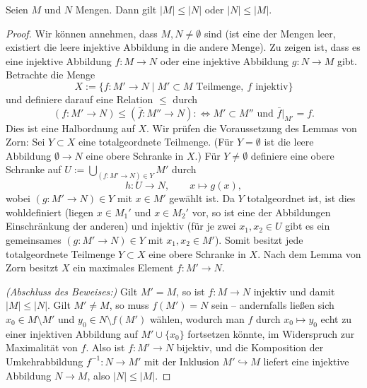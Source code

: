 \begin{satz}
Seien $M$ und $N$ Mengen. Dann gilt $|M|\le|N|$ oder $|N|\le|M|$.
\end{satz}
\begin{proof}
Wir können annehmen, dass $M,N\ne\emptyset$ sind (ist eine der Mengen
leer, existiert die leere injektive Abbildung in die andere Menge).
Zu zeigen ist, dass es eine injektive Abbildung $f:M\to N$ oder eine
injektive Abbildung $g:N\to M$ gibt.
Betrachte die Menge
\[
    X:=\{f:M'\to N\mid M'\subset M\text{ Teilmenge},\ f\text{ injektiv}\}
\]
und definiere darauf eine Relation $\le$ durch
\[
    (f:M'\to N)\le(\bar f:M''\to N)
    :\iff M'\subset M''\text{ und }\bar f|_{M'}=f.
\]
Dies ist eine Halbordnung auf $X$. Wir prüfen die Voraussetzung des
Lemmas von Zorn: Sei $Y\subset X$ eine totalgeordnete Teilmenge.
(Für $Y=\emptyset$ ist die leere Abbildung $\emptyset\to N$ eine obere
Schranke in $X$.) Für $Y\ne\emptyset$ definiere eine obere Schranke
auf $U:=\bigcup_{(f:M'\to N)\in Y}M'$ durch
\[
    h:U\longrightarrow N,\qquad x\longmapsto g(x),
\]
wobei $(g:M'\to N)\in Y$ mit $x\in M'$ gewählt ist.
Da $Y$ totalgeordnet ist, ist dies wohldefiniert (liegen $x\in M_1'$ und
$x\in M_2'$ vor, so ist eine der Abbildungen Einschränkung der anderen)
und injektiv (für je zwei $x_1,x_2\in U$ gibt es ein gemeinsames
$(g:M'\to N)\in Y$ mit $x_1,x_2\in M'$).
Somit besitzt jede totalgeordnete Teilmenge $Y\subset X$ eine obere Schranke
in $X$. Nach dem Lemma von Zorn besitzt $X$ ein maximales Element
$f:M'\to N$.

\emph{(Abschluss des Beweises:)} Gilt $M'=M$, so ist $f:M\to N$ injektiv
und damit $|M|\le|N|$. Gilt $M'\ne M$, so muss $f(M')=N$ sein --
andernfalls ließen sich $x_0\in M\setminus M'$ und $y_0\in N\setminus f(M')$
wählen, wodurch man $f$ durch $x_0\mapsto y_0$ echt zu einer injektiven
Abbildung auf $M'\cup\{x_0\}$ fortsetzen könnte, im Widerspruch zur
Maximalität von $f$. Also ist $f:M'\to N$ bijektiv, und die Komposition
der Umkehrabbildung $f^{-1}:N\to M'$ mit der Inklusion $M'\hookrightarrow M$
liefert eine injektive Abbildung $N\to M$, also $|N|\le|M|$.
\end{proof}
